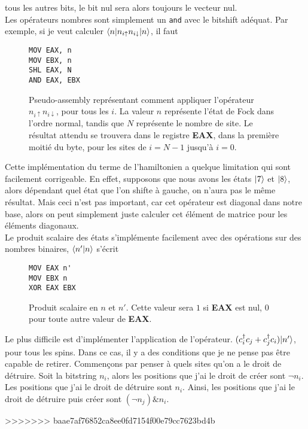 \documentclass{subfiles}[../main.tex]
\begin{document}
                tous les autres bits, le bit nul sera alors toujours le vecteur
                nul.\\
                Les opérateurs nombres sont simplement un \texttt{and} avec
                le bitshift adéquat. Par exemple, si je veut calculer
                $\langle{n}|n_{i\uparrow}n_{i\downarrow}|{n}\rangle$, il faut
                \begin{figure}[H]
                \begin{verbatim}
MOV EAX, n
MOV EBX, n
SHL EAX, N
AND EAX, EBX
                \end{verbatim}
                    \caption{Pseudo-assembly représentant comment appliquer
                    l'opérateur $n_{i\uparrow}n_{i\downarrow}$, pour tous les
                    $i$. La valeur $n$ représente l'état de Fock dans l'ordre
                    normal, tandis que $N$ représente le nombre de site. Le
                    résultat attendu se trouvera dans le registre \textbf{EAX},
                    dans la première moitié du byte,
                    pour les sites de $i=N-1$ jusqu'à $i=0$.}
                \end{figure}
                Cette implémentation du terme de l'hamiltonien a quelque
                limitation qui sont facilement corrigeable. En effet, supposons
                que nous avons les états $|{7}\rangle$ et $|{8}\rangle$, alors dépendant
                quel état que l'on shifte à gauche, on n'aura pas le même résultat.
                Mais ceci n'est pas important, car cet opérateur est diagonal
                dans notre base, alors on peut simplement juste calculer cet
                élément de matrice pour les éléments diagonaux.\\
                Le produit scalaire des états s'implémente facilement avec des
                opérations sur des nombres binaires, $\langle{n'}|{n}\rangle$ s'écrit
                \begin{figure}[H]
                \begin{verbatim}
MOV EAX n'
MOV EBX n
XOR EAX EBX
                \end{verbatim}
                    \caption{Produit scalaire en $n$ et $n'$. Cette valeur sera
                    $1$ si \textbf{EAX} est nul, $0$ pour toute autre valeur de
                    \textbf{EAX}.}
                \end{figure}
                Le plus difficile est d'implémenter l'application de l'opérateur.
                $(c^\dagger_ic_j+c^\dagger_jc_i)|{n'}\rangle$, pour tous les spins. Dans ce
                cas, il y a des conditions que je ne pense pas être capable de
                retirer.
                Commençons par penser à quels sites qu'on a le droit de détruire.
                Soit la bitstring $n_i$, alors les positions que j'ai le droit
                de créer sont $\neg n_i$. Les positions que j'ai le droit de
                détruire sont $n_i$. Ainsi, les positions que j'ai le droit
                de détruire puis créer sont $(\neg n_j)\&n_i$.

>>>>>>> baae7af76852ca8ee0fd7154f00e79cc7623bd4b
\end{document}

